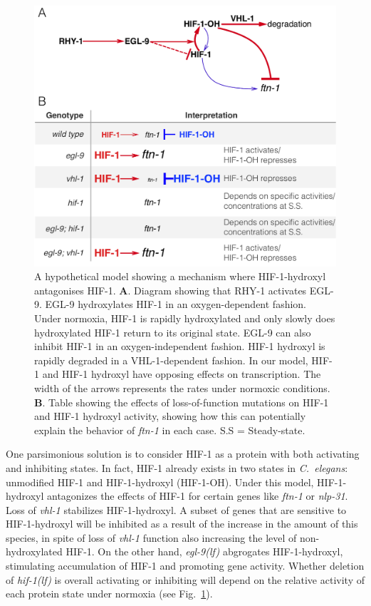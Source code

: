 \documentclass[9pt,twocolumn,twoside]{pnas-new}
\newcommand{\cel}{\emph{C.~elegans}}
\newcommand{\gene}[1]{\mbox{\emph{#1}}}
\newcommand{\nlp}{\gene{nlp-31}}
\newcommand{\ftna}{\gene{ftn-1}}
\newcommand{\egl}{\gene{egl-9(lf)}}
\newcommand{\hif}{\gene{hif-1(lf)}}
\newcommand{\hifp}{HIF-1}
\begin{document}
\begin{figure}[tbhp]
  \centering
  \includegraphics[width=.5\textwidth]{../figs/hif1oh_model.pdf}
  \caption{
    A hypothetical model showing a mechanism where \hifp{}-hydroxyl antagonises
    \hifp{}. \textbf{A}. Diagram showing that RHY-1 activates EGL-9. EGL-9
    hydroxylates HIF-1 in an oxygen-dependent fashion. Under normoxia, HIF-1 is
    rapidly hydroxylated and only slowly does hydroxylated HIF-1 return to its
    original state. EGL-9 can also inhibit HIF-1 in an oxygen-independent
    fashion. HIF-1 hydroxyl is rapidly degraded in a VHL-1-dependent fashion. In
    our model, HIF-1 and HIF-1 hydroxyl have opposing effects on transcription.
    The width of the arrows represents the rates under normoxic conditions.
    \textbf{B}. Table showing the effects of loss-of-function mutations on HIF-1
    and HIF-1 hydroxyl activity, showing how this can potentially explain the
    behavior of \gene{ftn-1} in each case. S.S = Steady-state.
  }
\label{fig:hif1oh_table}
\end{figure}

One parsimonious solution is to consider \hifp{} as a protein with both
activating and inhibiting states. In fact, \hifp{} already exists in two states
in \cel{}: unmodified \hifp{} and \hifp{}-hydroxyl (\hifp{}-OH). Under this
model, \hifp{}-hydroxyl antagonizes the effects of \hifp{} for certain genes
like \ftna{} or \nlp{}. Loss of \gene{vhl-1} stabilizes \hifp{}-hydroxyl. A
subset of genes that are sensitive to \hifp{}-hydroxyl will be inhibited as a
result of the increase in the amount of this species, in spite of loss of
\gene{vhl-1} function also increasing the level of non-hydroxylated \hifp{}. On
the other hand, \egl{} abgrogates \hifp{}-hydroxyl, stimulating accumulation of
\hifp{} and promoting gene activity. Whether deletion of \hif{} is overall
activating or inhibiting will depend on the relative activity of each protein
state under normoxia (see Fig.~\ref{fig:hif1oh_table}).
\end{document}
